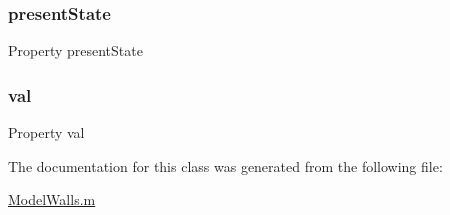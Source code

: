 \subsubsection{\texorpdfstring{present\+State}{presentState}}
{\footnotesize\ttfamily Property present\+State}

\mbox{\label{class_model_walls_aae3a423b8c844683e2adba0472347fe1}} 
\subsubsection{\texorpdfstring{val}{val}}
{\footnotesize\ttfamily Property val}



The documentation for this class was generated from the following file\+:\begin{DoxyCompactItemize}
\item 
\hyperlink{_model_walls_8m}{Model\+Walls.\+m}\end{DoxyCompactItemize}
